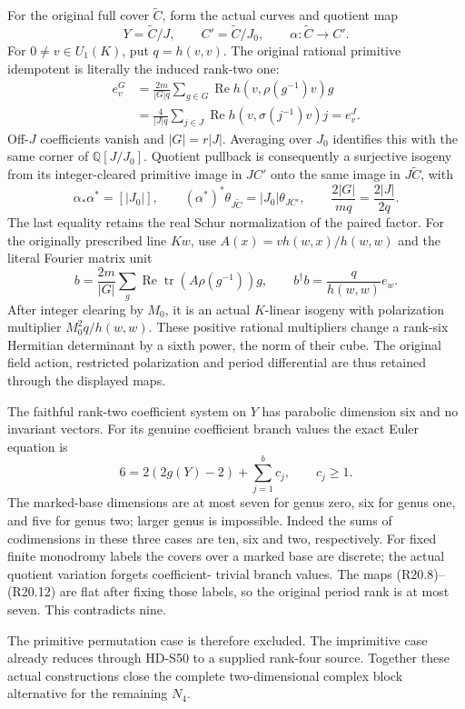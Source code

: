 For the original full cover \(\widetilde C\), form
the actual curves and quotient map
\[
       Y=\widetilde C/J,\qquad C'=\widetilde C/J_0,
       \qquad\alpha:\widetilde C\longrightarrow C'.    \tag{R20.9}
\]
For \(0\ne v\in U_1(K)\), put \(q=h(v,v)\).
The original rational primitive idempotent is literally
the induced rank-two one:
\[
 \begin{aligned}
 e_v^G&=\frac{2m}{|G|q}\sum_{g\in G}
             \operatorname{Re}h(v,\rho(g^{-1})v)g\\
      &=\frac4{|J|q}\sum_{j\in J}
             \operatorname{Re}h(v,\sigma(j^{-1})v)j=e_v^J.
 \end{aligned}                                             \tag{R20.10}
\]
Off-\(J\) coefficients vanish and \(|G|=r|J|\).
Averaging over \(J_0\) identifies this with the same
corner of \(\mathbb Q[J/J_0]\). Quotient pullback
is consequently a surjective isogeny from its
integer-cleared primitive image in \(JC'\) onto
the same image in \(J\widetilde C\), with
\[
 \alpha_*\alpha^*=[|J_0|],\qquad
 (\alpha^*)^*\theta_{J\widetilde C}=|J_0|\theta_{JC'},
 \qquad\frac{2|G|}{mq}=\frac{2|J|}{2q}.                \tag{R20.11}
\]
The last equality retains the real Schur normalization
of the paired factor. For the originally prescribed
line \(Kw\), use \(A(x)=v h(w,x)/h(w,w)\) and
the literal Fourier matrix unit
\[
 b=\frac{2m}{|G|}\sum_g\operatorname{Re}\operatorname{tr}
                (A\rho(g^{-1}))g,\qquad
                b^\dagger b=\frac{q}{h(w,w)}e_w.         \tag{R20.12}
\]
After integer clearing by \(M_0\), it is an actual
\(K\)-linear isogeny with polarization multiplier
\(M_0^2q/h(w,w)\). These positive rational multipliers
change a rank-six Hermitian determinant by a sixth
power, the norm of their cube. The original field
action, restricted polarization and period differential
are thus retained through the displayed maps.

The faithful rank-two coefficient system on \(Y\)
has parabolic dimension six and no invariant vectors.
For its genuine coefficient branch values the exact
Euler equation is
\[
               6=2(2g(Y)-2)+\sum_{j=1}^b c_j,
                       \qquad c_j\ge1.                  \tag{R20.13}
\]
The marked-base dimensions are at most seven for
genus zero, six for genus one, and five for genus
two; larger genus is impossible. Indeed the sums
of codimensions in these three cases are ten, six
and two, respectively. For fixed finite monodromy
labels the covers over a marked base are discrete;
the actual quotient variation forgets coefficient-
trivial branch values. The maps (R20.8)--(R20.12)
are flat after fixing those labels, so the original
period rank is at most seven. This contradicts nine.

The primitive permutation case is therefore excluded.
The imprimitive case already reduces through HD-S50
to a supplied rank-four source. Together these actual
constructions close the complete two-dimensional
complex block alternative for the remaining \(N_4\).
